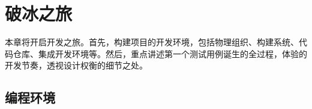 \begin{savequote}[45mm]
\end{savequote}

\chapter{破冰之旅} 
\label{ch:ice-breaker}

\begin{content}

本章将开启开发之旅。首先，构建项目的开发环境，包括物理组织、构建系统、代码仓库、集成开发环境等。然后，重点讲述第一个测试用例诞生的全过程，体验的开发节奏，透视设计权衡的细节之处。

\end{content}

\section{编程环境}

